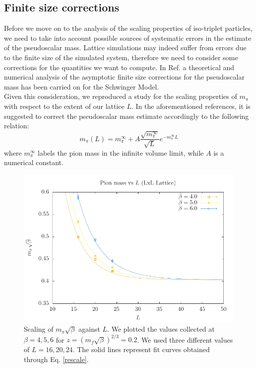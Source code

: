 \subsection{Finite size corrections}
Before we move on to the analysis of the scaling properties of iso-triplet particles, we need to take into account possible sources of systematic errors in the estimate of the pseudoscalar mass. Lattice simulations may indeed suffer from errors due to the finite size of the simulated system, therefore we need to consider some corrections for the quantities we want to compute. In Ref. \cite{Gutsfeld_1999, Luscher:1986pf} a theoretical and numerical analysis of the asymptotic finite size corrections for the pseudoscalar mass has been carried on for the Schwinger Model.
\\ Given this consideration, we reproduced a study for the scaling properties of $m_\pi$ with respect to the extent of our lattice $L$. In the aforementioned references, it is suggested to correct the pseudoscalar mass estimate accordingly to the following relation:
\begin{equation}\label{rescale}
    m_\pi(L) = m_\pi^{\infty} + A\frac{\sqrt{m_\pi^{\infty}}}{\sqrt{L}}e^{-m_{\pi}^{\infty}L}
\end{equation}
where $m_\pi^{\infty}$ labels the pion mass in the infinite volume limit, while $A$ is a numerical constant.
\begin{figure}
    \centering
    \includegraphics{images/mL.pdf}
    \caption{Scaling of $m_\pi \sqrt{\beta}$ against $L$. We plotted the values collected at $\beta = 4, 5, 6$ for $z = (m_f \sqrt{\beta})^{2/3} = 0.2$. We used three different values of $L = 16, 20, 24$. The solid lines represent fit curves obtained through Eq. \eqref{rescale}.}
    \label{fig: m vs L}
\end{figure}
